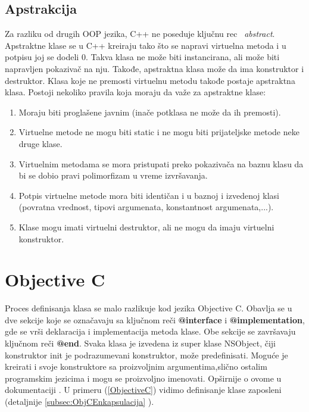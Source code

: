 \documentclass[a4paper]{article}
\begin{document}
\subsection{Apstrakcija}
\label{subsec:c++Apstrakcija}
Za razliku od drugih OOP jezika, C++ ne poseduje ključnu rec ~{\em abstract}. Apstraktne klase se u C++ kreiraju tako što se napravi virtuelna metoda i u potpisu joj se dodeli 0. Takva klasa ne može biti instancirana, ali može biti napravljen pokazivač na nju. Takođe, apstraktna klasa može da ima konstruktor i destruktor. Klasa koje ne premosti virtuelnu metodu takođe postaje apstraktna klasa. Postoji nekoliko pravila koja moraju da važe za apstraktne klase:
\begin{enumerate}
	\item Moraju biti proglašene javnim (inače potklasa ne može da ih premosti).
	\item Virtuelne metode ne mogu biti static i ne mogu biti prijateljske metode neke druge klase.
	\item Virtuelnim metodama se mora pristupati preko pokazivača na baznu klasu da bi se dobio pravi polimorfizam u vreme izvršavanja.
	\item Potpis virtuelne metode mora biti identičan i u baznoj i izvedenoj klasi (povratna vrednost, tipovi argumenata, konstantnost argumenata,...).
	\item Klase mogu imati virtuelni destruktor, ali ne mogu da imaju virtuelni konstruktor.
\end{enumerate}

\section{Objective C}
\label{sec:ObjectiveC}

Proces definisanja klasa se malo razlikuje kod jezika Objective C. Obavlja se u dve sekcije koje se označavaju sa ključnom reči \textbf{@interface} i \textbf{@implementation}, gde se vrši deklaracija i implementacija metoda klase. Obe sekcije se završavaju ključnom reči \textbf{@end}. Svaka klasa je izvedena iz super klase NSObject, čiji konstruktor init je podrazumevani konstruktor, može predefinisati. Moguće je kreirati i svoje konstruktore sa proizvoljnim argumentima,slično ostalim programskim jezicima i mogu se proizvoljno imenovati. Opširnije o ovome u dokumentaciji \cite{ObjectiveCdoc}. U primeru (\ref{ObjectiveC}) vidimo definisanje klase zaposleni (detaljnije \ref{subsec:ObjCEnkapsulacija} ).
\end{document}
